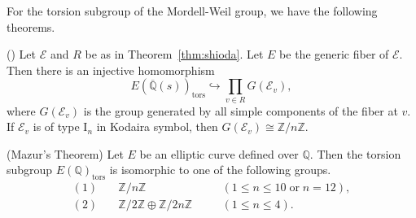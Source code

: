 \documentclass[main]{subfiles}
\begin{document}
For the torsion subgroup of the Mordell-Weil group, we have the following theorems.
\begin{thm}{(\cite[Lem.3.5]{ref:naskrecki2013})}
    \label{thm:torsion}
    Let $\mathcal{E}$ and $R$ be as in Theorem~\ref{thm:shioda}.
    Let $E$ be the generic fiber of $\mathcal{E}$.
    Then there is an injective homomorphism
    \begin{equation*}
        E(\overline{\mathbb{Q}}(s))_{\text{tors}} \hookrightarrow \prod_{v \in R} G(\mathcal{E}_{v}),
    \end{equation*}
    where $G(\mathcal{E}_{v})$ is the group generated by all simple components of the fiber at $v$.
    If $\mathcal{E}_{v}$ is of type $\mathrm{I}_n$ in Kodaira symbol, then $G(\mathcal{E}_{v}) \cong \mathbb{Z} / n \mathbb{Z}$.
\end{thm}

\begin{thm}{(Mazur's Theorem)}
    \label{thm:mazur}
    Let $E$ be an elliptic curve defined over $\mathbb{Q}$.
    Then the torsion subgroup $E(\mathbb{Q})_{\text{tors}}$ is isomorphic to one of the following groups.
    \begin{align*}
        (1) & \quad \mathbb{Z} / n \mathbb{Z} \quad                                   &  & (1 \leq n \leq 10 \; \text{or}\; n = 12), \\
        (2) & \quad \mathbb{Z} / 2 \mathbb{Z} \oplus \mathbb{Z} / 2n \mathbb{Z} \quad &  & (1 \leq n \leq 4).
    \end{align*}
\end{thm}
\end{document}
